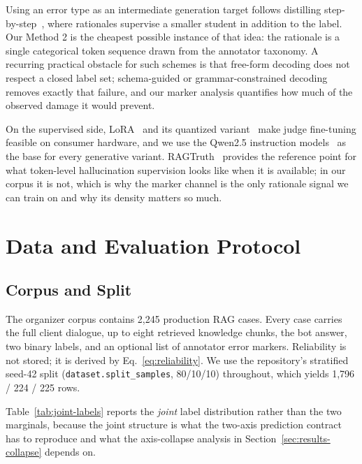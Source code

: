 \documentclass{zapiski}
\begin{document}
Using an error type as an intermediate generation target follows distilling
step-by-step~\cite{hsieh2023distilling}, where rationales supervise a smaller
student in addition to the label. Our Method 2 is the cheapest possible
instance of that idea: the rationale is a single categorical token sequence
drawn from the annotator taxonomy. A recurring practical obstacle for such
schemes is that free-form decoding does not respect a closed label set;
schema-guided or grammar-constrained decoding~\cite{willard2023efficient}
removes exactly that failure, and our marker analysis quantifies how much of
the observed damage it would prevent.

On the supervised side, LoRA~\cite{hu2021lora} and its quantized
variant~\cite{dettmers2023qlora} make judge fine-tuning feasible on consumer
hardware, and we use the Qwen2.5 instruction models~\cite{qwen2024qwen25} as
the base for every generative variant. RAGTruth~\cite{niu2024ragtruth}
provides the reference point for what token-level hallucination supervision
looks like when it is available; in our corpus it is not, which is why the
marker channel is the only rationale signal we can train on and why its
density matters so much.

\section{Data and Evaluation Protocol}
\label{sec:data}

\subsection{Corpus and Split}

The organizer corpus contains 2,245 production RAG cases. Every case carries
the full client dialogue, up to eight retrieved knowledge chunks, the bot
answer, two binary labels, and an optional list of annotator error markers.
Reliability is not stored; it is derived by Eq.~\ref{eq:reliability}. We use
the repository's stratified seed-42 split
(\texttt{dataset.split\_samples}, 80/10/10) throughout, which yields
1,796 / 224 / 225 rows.

Table~\ref{tab:joint-labels} reports the \emph{joint} label distribution
rather than the two marginals, because the joint structure is what the
two-axis prediction contract has to reproduce and what the axis-collapse
analysis in Section~\ref{sec:results-collapse} depends on.
\end{document}

